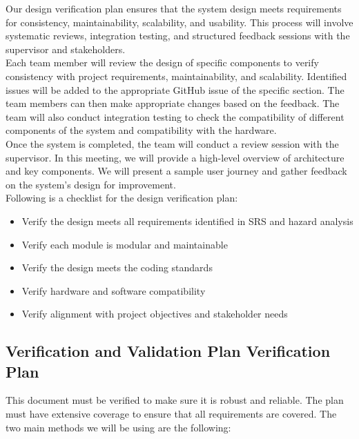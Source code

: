 \documentclass[12pt, titlepage]{article}
\begin{document}
Our design verification plan ensures that the system design meets requirements for consistency, maintainability, scalability, and usability. This process will involve systematic reviews, integration testing, and structured feedback sessions with the supervisor and stakeholders.\\
Each team member will review the design of specific components to verify consistency with project requirements, maintainability, and scalability. Identified issues will be added to the appropriate GitHub issue of the specific section. The team members can then make appropriate changes based on the feedback. The team will also conduct integration testing to check the compatibility of different components of the system and compatibility with the hardware.\\
Once the system is completed, the team will conduct a review session with the supervisor. In this meeting, we will provide a high-level overview of architecture and key components. We will present a sample user journey and gather feedback on the system's design for improvement.\\

Following is a checklist for the design verification plan: 
\begin{itemize}
  \item Verify the design meets all requirements identified in SRS and hazard analysis
  \item Verify each module is modular and maintainable
  \item Verify the design meets the coding standards
  \item Verify hardware and software compatibility
  \item Verify alignment with project objectives and stakeholder needs
\end{itemize}

\subsection{Verification and Validation Plan Verification Plan} \label{section:3.4}

This document must be verified to make sure it is robust and reliable. The plan must have extensive coverage to ensure that all requirements are covered. The two main methods we will be using are the following:
\end{document}
